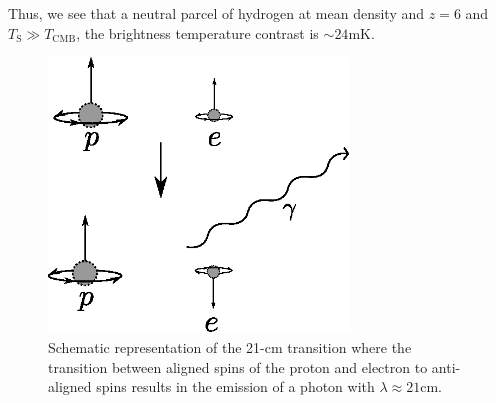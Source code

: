 Thus, we see that a neutral parcel of hydrogen at mean density and $z = 6$ and $T_{\text{S}} \gg T_{\text{CMB}}$, the brightness temperature contrast is $\sim 24\text{mK}$.




\begin{figure}[h]
  \centering
  \includegraphics[width=8cm]{21cmline.eps}
  \caption{Schematic representation of the 21-cm transition where the transition between aligned spins of the proton and electron to anti-aligned spins results in the emission of a photon with $\lambda \approx 21$cm. }
  \label{fig:21cmline}
\end{figure}


